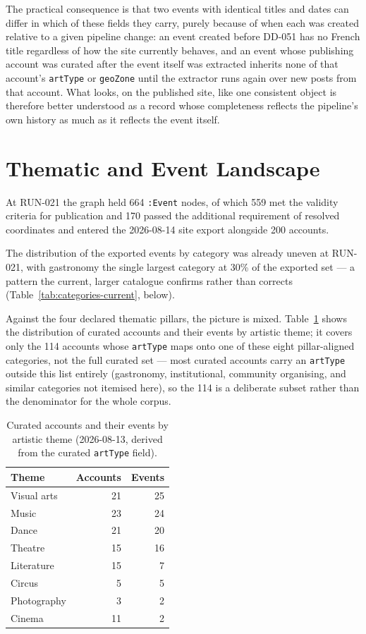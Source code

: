 \documentclass[12pt, a4paper]{report}
\begin{document}
The practical consequence is that two events with identical titles and
dates can differ in which of these fields they carry, purely because of
when each was created relative to a given pipeline change: an event
created before DD-051 has no French title regardless of how the site
currently behaves, and an event whose publishing account was curated
after the event itself was extracted inherits none of that account's
\texttt{artType} or \texttt{geoZone} until the extractor runs again over
new posts from that account. What looks, on the published site, like one
consistent object is therefore better understood as a record whose
completeness reflects the pipeline's own history as much as it reflects
the event itself.

\section{Thematic and Event Landscape}
\label{sec:thematic}

At RUN-021 the graph held 664 \texttt{:Event} nodes, of which 559 met the
validity criteria for publication and 170 passed the additional
requirement of resolved coordinates and entered the 2026-08-14 site
export alongside 200 accounts.

The distribution of the exported events by category was already uneven
at RUN-021, with gastronomy the single largest category at 30\% of the
exported set — a pattern the current, larger catalogue confirms rather
than corrects (Table~\ref{tab:categories-current}, below).

Against the four declared thematic pillars, the picture is mixed.
Table~\ref{tab:themes} shows the distribution of curated accounts and
their events by artistic theme; it covers only the 114 accounts whose
\texttt{artType} maps onto one of these eight pillar-aligned categories,
not the full curated set — most curated accounts carry an
\texttt{artType} outside this list entirely (gastronomy, institutional,
community organising, and similar categories not itemised here), so the
114 is a deliberate subset rather than the denominator for the whole
corpus.

\begin{table}[htbp]
\centering
\caption{Curated accounts and their events by artistic theme
(2026-08-13, derived from the curated \texttt{artType} field).}
\label{tab:themes}
\begin{tabular}{lrr}
\toprule
Theme & Accounts & Events \\
\midrule
Visual arts & 21 & 25 \\
Music & 23 & 24 \\
Dance & 21 & 20 \\
Theatre & 15 & 16 \\
Literature & 15 & 7 \\
Circus & 5 & 5 \\
Photography & 3 & 2 \\
Cinema & 11 & 2 \\
\bottomrule
\end{tabular}
\end{table}
\end{document}
